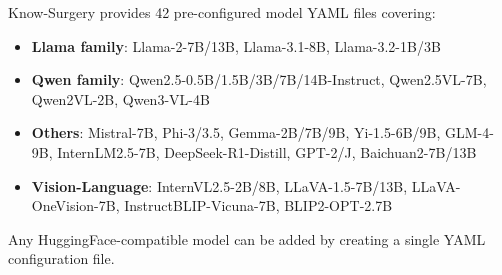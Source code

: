 Know-Surgery provides 42 pre-configured model YAML files covering:
\begin{itemize}
\setlength\itemsep{0pt}
\item \textbf{Llama family}: Llama-2-7B/13B, Llama-3.1-8B, Llama-3.2-1B/3B
\item \textbf{Qwen family}: Qwen2.5-0.5B/1.5B/3B/7B/14B-Instruct, Qwen2.5VL-7B, Qwen2VL-2B, Qwen3-VL-4B
\item \textbf{Others}: Mistral-7B, Phi-3/3.5, Gemma-2B/7B/9B, Yi-1.5-6B/9B, GLM-4-9B, InternLM2.5-7B, DeepSeek-R1-Distill, GPT-2/J, Baichuan2-7B/13B
\item \textbf{Vision-Language}: InternVL2.5-2B/8B, LLaVA-1.5-7B/13B, LLaVA-OneVision-7B, InstructBLIP-Vicuna-7B, BLIP2-OPT-2.7B
\end{itemize}
Any HuggingFace-compatible model can be added by creating a single YAML configuration file.
